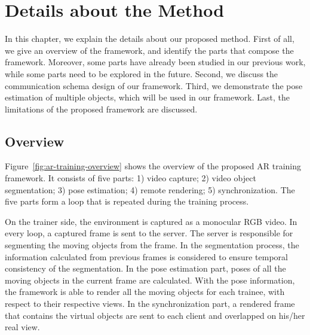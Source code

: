 \chapter{Details about the Method}
\label{chap:dm}

In this chapter, we explain the details about our proposed method.
First of all, we give an overview of the framework, and identify the parts that compose the framework. Moreover, some parts have already been studied in our previous work, while some parts need to be explored in the future.
Second, we discuss the communication schema design of our framework.
Third, we demonstrate the pose estimation of multiple objects, which will be used in our framework.
Last, the limitations of the proposed framework are discussed.

\section{Overview}
\label{sec:dm:ov}

Figure~\ref{fig:ar-training-overview} shows the overview of the proposed AR training framework. It consists of five parts: 1) video capture; 2) video object segmentation; 3) pose estimation; 4) remote rendering; 5) synchronization.
The five parts form a loop that is repeated during the training process.

On the trainer side, the environment is captured as a monocular RGB video. In every loop, a captured frame is sent to the server.
The server is responsible for segmenting the moving objects from the frame. In the segmentation process, the information calculated from previous frames is considered to ensure temporal consistency of the segmentation.
In the pose estimation part, poses of all the moving objects in the current frame are calculated.
With the pose information, the framework is able to render all the moving objects for each trainee, with respect to their respective views.
In the synchronization part, a rendered frame that contains the virtual objects are sent to each client and overlapped on his/her real view.

